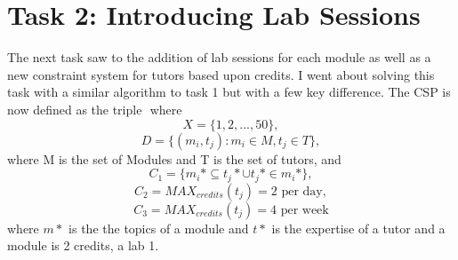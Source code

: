 \documentclass[conference]{IEEEtran}
\begin{document}
\section{Task 2: Introducing Lab Sessions}
The next task saw to the addition of lab sessions for each module as well as a new constraint system for tutors based upon credits. I went about solving this task with a similar algorithm to task 1 but with a few key difference. The CSP is now defined as the triple \(<X, D, C>\) where 
\begin{equation*}
X = \{1, 2,..., 50\},
\end{equation*}
\begin{equation*}
D = \{(m_{i}, t_{j}): m_{i}\in M, t_{j}\in T \},
\end{equation*}
where M is the set of Modules and T is the set of tutors, and
\begin{equation*}
C_{1} = \{m_{i}*\subseteq t_{j}* \cup t_{j}*\in m_{i}*\},
\end{equation*}
\begin{equation*}
C_{2} = MAX_{credits}(t_{j}) = \textrm{2 per day},
\end{equation*}
\begin{equation*}
C_{3} = MAX_{credits}(t_{j}) = \textrm{4 per week}
\end{equation*}
where \(m*\) is the the topics of a module and \(t*\) is the expertise of a tutor and a module is 2 credits, a lab 1.
\end{document}

